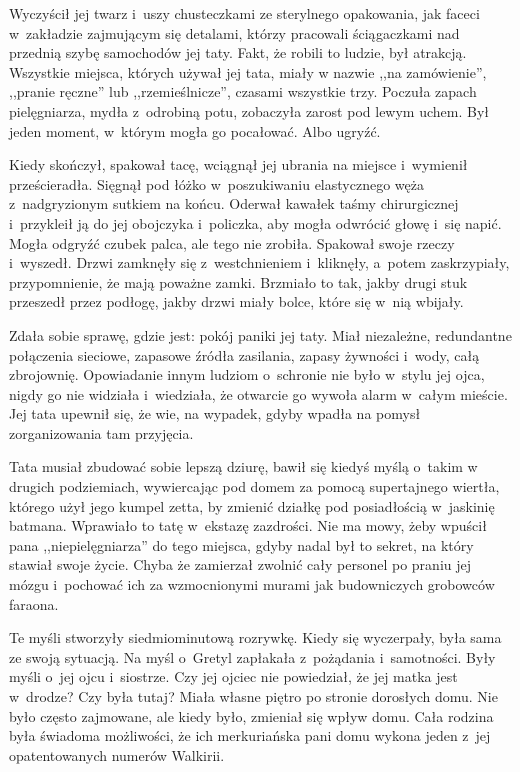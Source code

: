 \documentclass[oneside,polish,11pt,sfheadings]{mwbk}
\begin{document}
Wyczyścił jej twarz i~uszy chusteczkami ze sterylnego opakowania, jak
faceci w~zakładzie zajmującym się detalami, którzy pracowali
ściągaczkami nad przednią szybę samochodów jej taty. Fakt, że robili to
ludzie, był atrakcją. Wszystkie miejsca, których używał jej tata, miały
w nazwie ,,na zamówienie'', ,,pranie ręczne'' lub ,,rzemieślnicze'',
czasami wszystkie trzy. Poczuła zapach pielęgniarza, mydła z~odrobiną
potu, zobaczyła zarost pod lewym uchem. Był jeden moment, w~którym mogła
go pocałować. Albo ugryźć.

Kiedy skończył, spakował tacę, wciągnął jej ubrania na miejsce i~wymienił prześcieradła. Sięgnął pod łóżko w~poszukiwaniu elastycznego
węża z~nadgryzionym sutkiem na końcu. Oderwał kawałek taśmy
chirurgicznej i~przykleił ją do jej obojczyka i~policzka, aby mogła
odwrócić głowę i~się napić. Mogła odgryźć czubek palca, ale tego nie
zrobiła. Spakował swoje rzeczy i~wyszedł. Drzwi zamknęły się z~westchnieniem i~kliknęły, a~potem zaskrzypiały, przypomnienie, że mają
poważne zamki. Brzmiało to tak, jakby drugi stuk przeszedł przez
podłogę, jakby drzwi miały bolce, które się w~nią wbijały.

Zdała sobie sprawę, gdzie jest: pokój paniki jej taty. Miał niezależne,
redundantne połączenia sieciowe, zapasowe źródła zasilania, zapasy
żywności i~wody, całą zbrojownię. Opowiadanie innym ludziom o~schronie
nie było w~stylu jej ojca, nigdy go nie widziała i~wiedziała, że
otwarcie go wywoła alarm w~całym mieście. Jej tata upewnił się, że wie,
na wypadek, gdyby wpadła na pomysł zorganizowania tam przyjęcia.

Tata musiał zbudować sobie lepszą dziurę, bawił się kiedyś myślą o~takim
w drugich podziemiach, wywiercając pod domem za pomocą supertajnego
wiertła, którego użył jego kumpel zetta, by zmienić działkę pod
posiadłością w~jaskinię batmana. Wprawiało to tatę w~ekstazę zazdrości.
Nie ma mowy, żeby wpuścił pana ,,nie\dywiz pielęgniarza'' do tego miejsca,
gdyby nadal był to sekret, na który stawiał swoje życie. Chyba że
zamierzał zwolnić cały personel po praniu jej mózgu i~pochować ich za
wzmocnionymi murami jak budowniczych grobowców faraona.

Te myśli stworzyły siedmiominutową rozrywkę. Kiedy się wyczerpały, była
sama ze swoją sytuacją. Na myśl o~Gretyl zapłakała z~pożądania i~samotności. Były myśli o~jej ojcu i~siostrze. Czy jej ojciec nie
powiedział, że jej matka jest w~drodze? Czy była tutaj? Miała własne
piętro po stronie dorosłych domu. Nie było często zajmowane, ale kiedy
było, zmieniał się wpływ domu. Cała rodzina była świadoma możliwości, że
ich merkuriańska pani domu wykona jeden z~jej opatentowanych numerów
Walkirii.
\end{document}
